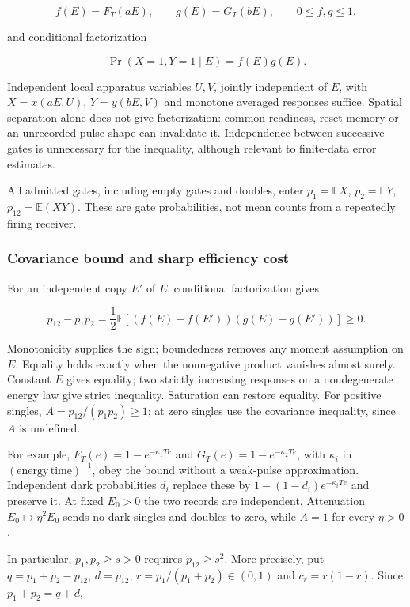 \documentclass[11pt,a4paper]{article}
\begin{document}
\[f(E)=F_T(aE),\qquad g(E)=G_T(bE),\qquad 0\le f,g\le1,\]

and conditional factorization

\[\Pr(X=1,Y=1\mid E)=f(E)g(E).\]

Independent local apparatus variables \(U,V\), jointly independent of
\(E\), with \(X=x(aE,U)\), \(Y=y(bE,V)\) and monotone averaged responses
suffice. Spatial separation alone does not give factorization: common
readiness, reset memory or an unrecorded pulse shape can invalidate it.
Independence between successive gates is unnecessary for the inequality,
although relevant to finite-data error estimates.

All admitted gates, including empty gates and doubles, enter
\(p_1=\mathbb EX\), \(p_2=\mathbb EY\), \(p_{12}=\mathbb E(XY)\). These
are gate probabilities, not mean counts from a repeatedly firing
receiver.

\hypertarget{covariance-bound-and-sharp-efficiency-cost}{%
\subsubsection{Covariance bound and sharp efficiency
cost}\label{covariance-bound-and-sharp-efficiency-cost}}

For an independent copy \(E'\) of \(E\), conditional factorization gives

\[p_{12}-p_1p_2
=\frac12\mathbb E[(f(E)-f(E'))(g(E)-g(E'))]\ge0.\]

Monotonicity supplies the sign; boundedness removes any moment
assumption on \(E\). Equality holds exactly when the nonnegative product
vanishes almost surely. Constant \(E\) gives equality; two strictly
increasing responses on a nondegenerate energy law give strict
inequality. Saturation can restore equality. For positive singles,
\(A=p_{12}/(p_1p_2)\ge1\); at zero singles use the covariance
inequality, since \(A\) is undefined.

For example, \(F_T(e)=1-e^{-\kappa_1Te}\) and
\(G_T(e)=1-e^{-\kappa_2Te}\), with \(\kappa_i\) in
\((\mathrm{energy}\,\mathrm{time})^{-1}\), obey the bound without a
weak-pulse approximation. Independent dark probabilities \(d_i\) replace
these by \(1-(1-d_i)e^{-\kappa_iTe}\) and preserve it. At fixed
\(E_0>0\) the two records are independent. Attenuation
\(E_0\mapsto\eta^2E_0\) sends no-dark singles and doubles to zero, while
\(A=1\) for every \(\eta>0\).

In particular, \(p_1,p_2\ge s>0\) requires \(p_{12}\ge s^2\). More
precisely, put \(q=p_1+p_2-p_{12}\), \(d=p_{12}\),
\(r=p_1/(p_1+p_2)\in(0,1)\) and \(c_r=r(1-r)\). Since \(p_1+p_2=q+d\),
\end{document}
